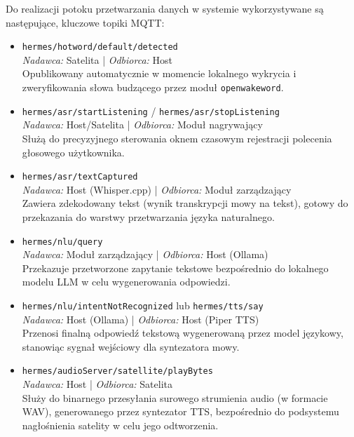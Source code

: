 \documentclass[12pt,a4paper]{article}
\begin{document}
Do realizacji potoku przetwarzania danych w systemie wykorzystywane są następujące, kluczowe topiki MQTT:
\begin{itemize}
    \item \texttt{hermes/hotword/default/detected} \\
    \textit{Nadawca:} Satelita | \textit{Odbiorca:} Host \\
    Opublikowany automatycznie w momencie lokalnego wykrycia i zweryfikowania słowa budzącego przez moduł \texttt{openwakeword}.
    
    \item \texttt{hermes/asr/startListening} / \texttt{hermes/asr/stopListening} \\
    \textit{Nadawca:} Host/Satelita | \textit{Odbiorca:} Moduł nagrywający \\
    Służą do precyzyjnego sterowania oknem czasowym rejestracji polecenia głosowego użytkownika.
    
    \item \texttt{hermes/asr/textCaptured} \\
    \textit{Nadawca:} Host (Whisper.cpp) | \textit{Odbiorca:} Moduł zarządzający \\
    Zawiera zdekodowany tekst (wynik transkrypcji mowy na tekst), gotowy do przekazania do warstwy przetwarzania języka naturalnego.
    
    \item \texttt{hermes/nlu/query} \\
    \textit{Nadawca:} Moduł zarządzający | \textit{Odbiorca:} Host (Ollama) \\
    Przekazuje przetworzone zapytanie tekstowe bezpośrednio do lokalnego modelu LLM w celu wygenerowania odpowiedzi.
    
    \item \texttt{hermes/nlu/intentNotRecognized} lub \texttt{hermes/tts/say} \\
    \textit{Nadawca:} Host (Ollama) | \textit{Odbiorca:} Host (Piper TTS) \\
    Przenosi finalną odpowiedź tekstową wygenerowaną przez model językowy, stanowiąc sygnał wejściowy dla syntezatora mowy.
    
    \item \texttt{hermes/audioServer/satellite/playBytes} \\
    \textit{Nadawca:} Host | \textit{Odbiorca:} Satelita \\
    Służy do binarnego przesyłania surowego strumienia audio (w formacie WAV), generowanego przez syntezator TTS, bezpośrednio do podsystemu nagłośnienia satelity w celu jego odtworzenia.
\end{itemize}
\end{document}
